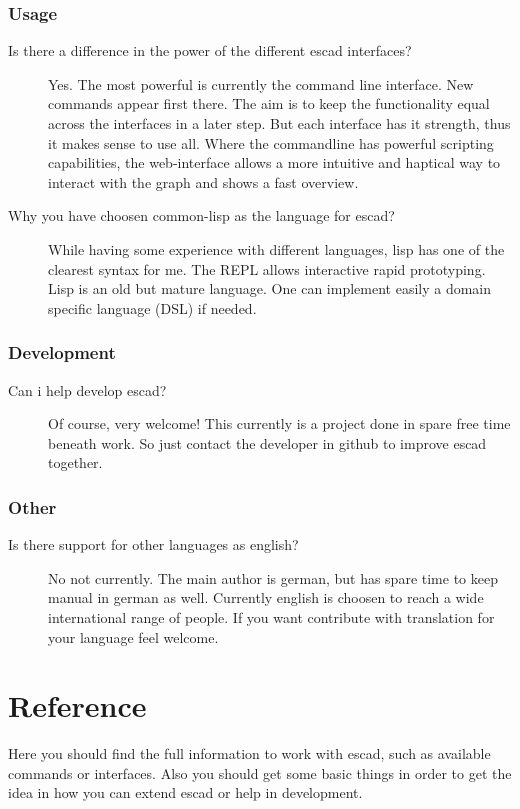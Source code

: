 \documentclass[a4paper, 12pt, openany]{scrbook}
\begin{document}
\subsection{Usage}
\begin{description}
\item[Is there a difference in the power of the different escad interfaces?] Yes. The most powerful is currently the command line interface. New commands appear first there. The aim is to keep the functionality equal across the interfaces in a later step. But each interface has it strength, thus it makes sense to use all. Where the commandline has powerful scripting capabilities, the web-interface allows a more intuitive and haptical way to interact with the graph and shows a fast overview.
\item[Why you have choosen common-lisp as the language for escad?] While having some experience with different languages, lisp has one of the clearest syntax for me. The REPL allows interactive rapid prototyping. Lisp is an old but mature language. One can implement easily a domain specific language (DSL) if needed.
\end{description}
\subsection{Development}
\begin{description}
\item[Can i help develop escad?] Of course, very welcome! This currently is a project done in spare free time beneath work. So just contact the developer in github to improve escad together.
\end{description}
\subsection{Other}
\begin{description}
\item[Is there support for other languages as english?]  No not currently. The main author is german, but has spare time to keep manual in german as well. Currently english is choosen to reach a wide international range of people. If you want contribute with translation for your language feel welcome.
\end{description}
\chapter{Reference}
Here you should find the full information to work with escad, such as available commands or interfaces. Also you should get some basic things in order to get the idea in how you can extend escad or help in development.
\end{document}
